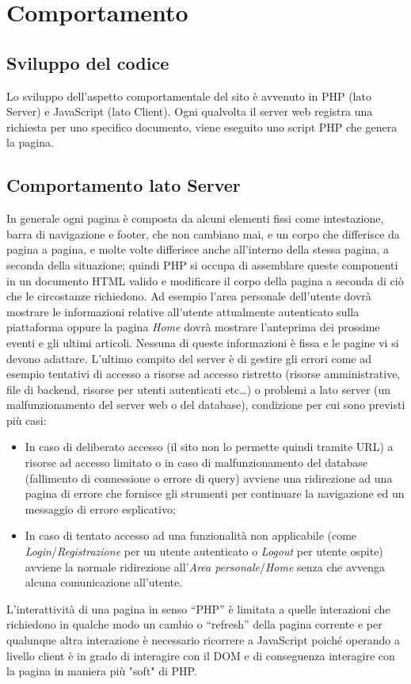 \section{Comportamento}
\label{Comportamento}
    \subsection{Sviluppo del codice}
    Lo sviluppo dell’aspetto comportamentale del sito è avvenuto in PHP (lato Server) e JavaScript (lato Client).
    Ogni qualvolta il server web registra una richiesta per uno specifico documento, viene eseguito uno script PHP che genera la pagina.
    \subsection{Comportamento lato Server}
    In generale ogni pagina è composta da alcuni elementi fissi come intestazione, barra di navigazione e footer, che non cambiano mai, e un corpo che differisce da pagina a pagina, e molte volte differisce anche all’interno della stessa pagina, a seconda della situazione; quindi PHP si occupa di assemblare queste componenti in un documento HTML valido e modificare il corpo della pagina a seconda di ciò che le circostanze richiedono.
    Ad esempio l’area personale dell’utente dovrà mostrare le informazioni relative all’utente attualmente autenticato sulla piattaforma oppure la pagina \textit{Home} dovrà mostrare l’anteprima dei prossime eventi e gli ultimi articoli. Nessuna di queste informazioni è fissa e le pagine vi si devono adattare.
    L’ultimo compito del server è di gestire gli errori come ad esempio tentativi di accesso a risorse ad accesso ristretto (risorse amministrative, file di backend, risorse per utenti autenticati etc…) o problemi a lato server (un malfunzionamento del server web o del database), condizione per cui sono previsti più casi:
    \begin{itemize}
        \item In caso di deliberato accesso (il sito non lo permette quindi tramite URL) a risorse ad accesso limitato o in caso di malfunzionamento del database (fallimento di connessione o errore di query) avviene una ridirezione ad una pagina di errore che fornisce gli strumenti per continuare la navigazione ed un messaggio di errore esplicativo;
        \item In caso di tentato accesso ad una funzionalità non applicabile (come \textit{Login}/\textit{Registrazione} per un utente autenticato o \textit{Logout} per utente ospite) avviene la normale ridirezione all’\textit{Area personale}/\textit{Home} senza che avvenga alcuna comunicazione all’utente.
    \end{itemize}
    L’interattività di una pagina in senso “PHP” è limitata a quelle interazioni che richiedono in qualche modo un cambio o “refresh” della pagina corrente e per qualunque altra interazione è necessario ricorrere a JavaScript poiché operando a livello client è in grado di interagire con il DOM e di conseguenza interagire con la pagina in maniera più "soft" di PHP.

